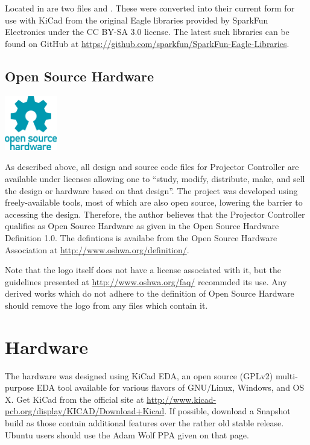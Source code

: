 \documentclass{article}
\begin{document}
Located in  are two files  and
.  These were converted into their current form for use with KiCad from the
original Eagle libraries provided by SparkFun Electronics under the CC BY-SA 3.0 license.  The
latest such libraries can be found on GitHub at
\url{https://github.com/sparkfun/SparkFun-Eagle-Libraries}.

\subsection{Open Source Hardware} \label{ssec:OpenSourceHW}
\begin{floatingfigure}{0.22\textwidth}
    \centering
    \vspace{-6pt}
    \includegraphics[width=0.17\textwidth]{oshw-logo-200-px}
\end{floatingfigure}

As described above, all design and source code files for Projector Controller are available under
licenses allowing one to ``study, modify, distribute, make, and sell the design or hardware based on
that design''.  The project was developed using freely-available tools, most of which are also open
source, lowering the barrier to accessing the design.  Therefore, the author believes that the
Projector Controller qualifies as Open Source Hardware as given in the Open Source Hardware
Definition 1.0.  The defintions is availabe from the Open Source Hardware Association at
\url{http://www.oshwa.org/definition/}.

Note that the logo itself does not have a license associated with it, but the guidelines presented
at \url{http://www.oshwa.org/faq/} recommded its use.  Any derived works which do not adhere to the
definition of Open Source Hardware should remove the logo from any files which contain it.


\section{Hardware} \label{sec:Hardware}
The hardware was designed using KiCad EDA, an open source (GPLv2) multi-purpose EDA tool available
for various flavors of GNU/Linux, Windows, and OS X.  Get KiCad from the official site at
\url{http://www.kicad-pcb.org/display/KICAD/Download+Kicad}.  If possible, download a Snapshot build
as those contain additional features over the rather old stable release.  Ubuntu users should use
the Adam Wolf PPA given on that page.
\end{document}
